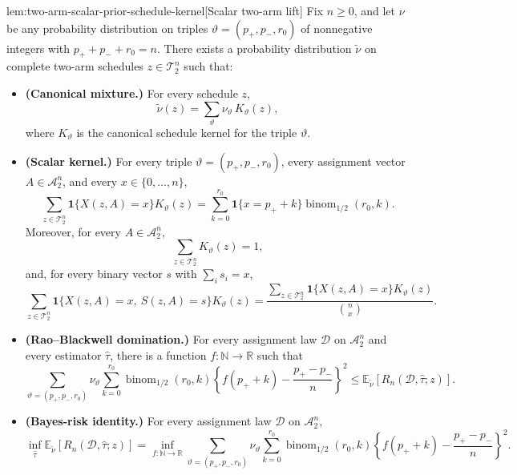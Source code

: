 \documentclass[11pt]{article}
\begin{document}
\begin{lemmav}{lem:two-arm-scalar-prior-schedule-kernel}[Scalar two-arm lift]
Fix \(n\ge 0\), and let \(\nu\) be any probability distribution on triples
\(\vartheta=(p_+,p_-,r_0)\) of nonnegative integers with
\(p_++p_-+r_0=n\).  There exists a probability distribution \(\widetilde\nu\)
on complete two-arm schedules \(z\in\mathcal T_2^n\) such that:
\begin{itemize}
\item \textbf{(Canonical mixture.)} For every schedule \(z\),
\[
\widetilde\nu(z)
=
\sum_{\vartheta}\nu_\vartheta\,K_\vartheta(z),
\]
where \(K_\vartheta\) is the canonical schedule kernel for the triple
\(\vartheta\).

\item \textbf{(Scalar kernel.)} For every triple
\(\vartheta=(p_+,p_-,r_0)\), every assignment vector
\(A\in\mathcal A_2^n\), and every \(x\in\{0,\ldots,n\}\),
\[
\sum_{z\in\mathcal T_2^n}
\mathbf 1\{X(z,A)=x\}K_\vartheta(z)
=
\sum_{k=0}^{r_0}
\mathbf 1\{x=p_+ + k\}\operatorname{binom}_{1/2}(r_0,k).
\]
Moreover, for every \(A\in\mathcal A_2^n\),
\[
\sum_{z\in\mathcal T_2^n} K_\vartheta(z)=1,
\]
and, for every binary vector \(s\) with \(\sum_i s_i=x\),
\[
\sum_{z\in\mathcal T_2^n}
\mathbf 1\{X(z,A)=x,\ S(z,A)=s\}K_\vartheta(z)
=
\frac{
\sum_{z\in\mathcal T_2^n}\mathbf 1\{X(z,A)=x\}K_\vartheta(z)
}{
\binom{n}{x}
}.
\]

\item \textbf{(Rao--Blackwell domination.)} For every assignment law
\(\mathcal D\) on \(\mathcal A_2^n\) and every estimator
\(\widehat\tau\), there is a function \(f:\mathbb N\to\mathbb R\) such that
\[
\sum_{\vartheta=(p_+,p_-,r_0)}
\nu_\vartheta
\sum_{k=0}^{r_0}
\operatorname{binom}_{1/2}(r_0,k)
\left\{
f(p_+ + k)-\frac{p_+-p_-}{n}
\right\}^2
\le
\mathbb E_{\widetilde\nu}
\!\left[
R_n(\mathcal D,\widehat\tau;z)
\right].
\]

\item \textbf{(Bayes-risk identity.)} For every assignment law
\(\mathcal D\) on \(\mathcal A_2^n\),
\[
\inf_{\widehat\tau}
\mathbb E_{\widetilde\nu}
\!\left[
R_n(\mathcal D,\widehat\tau;z)
\right]
=
\inf_{f:\mathbb N\to\mathbb R}
\sum_{\vartheta=(p_+,p_-,r_0)}
\nu_\vartheta
\sum_{k=0}^{r_0}
\operatorname{binom}_{1/2}(r_0,k)
\left\{
f(p_+ + k)-\frac{p_+-p_-}{n}
\right\}^2 .
\]
\end{itemize}
\end{lemmav}
\end{document}
